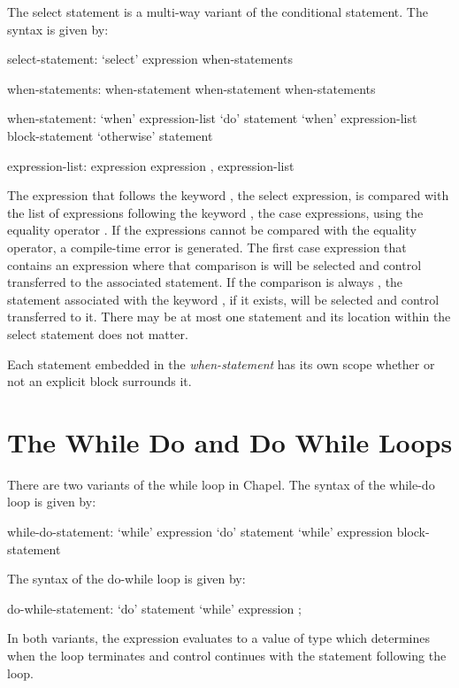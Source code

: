 The select statement is a multi-way variant of the conditional
statement.  The syntax is given by:
\begin{syntax}
select-statement:
  `select' expression { when-statements }

when-statements:
  when-statement
  when-statement when-statements

when-statement:
  `when' expression-list `do' statement
  `when' expression-list block-statement
  `otherwise' statement

expression-list:
  expression
  expression , expression-list
\end{syntax}
The expression that follows the keyword , the select
expression, is compared with the list of expressions following the
keyword , the case expressions, using the equality
operator \chpl{==}.  If the expressions cannot be compared with the
equality operator, a compile-time error is generated.  The first case
expression that contains an expression where that comparison
is  will be selected and control transferred to the
associated statement.  If the comparison is always , the
statement associated with the keyword , if it exists,
will be selected and control transferred to it.  There may be at most
one  statement and its location within the select
statement does not matter.

Each statement embedded in the {\em when-statement} has its own scope
whether or not an explicit block surrounds it.

\section{The While Do and Do While Loops}
\label{The_While_and_Do_While_Loops}

There are two variants of the while loop in Chapel.  The syntax of the
while-do loop is given by:
\begin{syntax}
while-do-statement:
  `while' expression `do' statement
  `while' expression block-statement
\end{syntax}
The syntax of the do-while loop is given by:
\begin{syntax}
do-while-statement:
  `do' statement `while' expression ;
\end{syntax}
In both variants, the expression evaluates to a value of type 
which determines when the loop terminates and control continues with
the statement following the loop.

